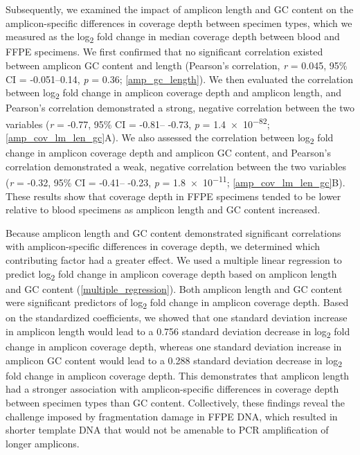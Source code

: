 \documentclass{bmcart}
\begin{document}
Subsequently, we examined the impact of amplicon length and GC content on the amplicon-specific differences in coverage depth between specimen types, which we measured as the log\textsubscript{2} fold change in median coverage depth between blood and FFPE specimens. We first confirmed that no significant correlation existed between amplicon GC content and length (Pearson's correlation, \textit{r} = 0.045, 95\% CI = -0.051--0.14, \textit{p} = 0.36; \autoref{amp_gc_length}). We then evaluated the correlation between log\textsubscript{2} fold change in amplicon coverage depth and amplicon length, and Pearson's correlation demonstrated a strong, negative correlation between the two variables (\textit{r} = -0.77, 95\% CI = -0.81-- -0.73, \textit{p} = \num{1.4e-82}; \autoref{amp_cov_lm_len_gc}A). We also assessed the correlation between log\textsubscript{2} fold change in amplicon coverage depth and amplicon GC content, and Pearson's correlation demonstrated a weak, negative correlation between the two variables (\textit{r} = -0.32, 95\% CI = -0.41-- -0.23, \textit{p} = \num{1.8e-11}; \autoref{amp_cov_lm_len_gc}B). These results show that coverage depth in FFPE specimens tended to be lower relative to blood specimens as amplicon length and GC content increased.

Because amplicon length and GC content demonstrated significant correlations with amplicon-specific differences in coverage depth, we determined which contributing factor had a greater effect. We used a multiple linear regression to predict log\textsubscript{2} fold change in amplicon coverage depth based on amplicon length and GC content (\autoref{multiple_regression}). Both amplicon length and GC content were significant predictors of log\textsubscript{2} fold change in amplicon coverage depth. Based on the standardized coefficients, we showed that one standard deviation increase in amplicon length would lead to a 0.756 standard deviation decrease in log\textsubscript{2} fold change in amplicon coverage depth, whereas one standard deviation increase in amplicon GC content would lead to a 0.288 standard deviation decrease in log\textsubscript{2} fold change in amplicon coverage depth. This demonstrates that amplicon length had a stronger association with amplicon-specific differences in coverage depth between specimen types than GC content. Collectively, these findings reveal the challenge imposed by fragmentation damage in FFPE DNA, which resulted in shorter template DNA that would not be amenable to PCR amplification of longer amplicons.
\end{document}
